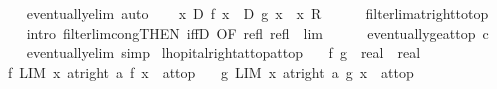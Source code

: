 \begin{isabellebody}
\ \ \ \ \isamarkupfalse%
\ eventually{\isacharunderscore}{\kern0pt}elim\ auto\isanewline
\ \ \isamarkupfalse%
\ {\isachardoublequoteopen}{\isacharparenleft}{\kern0pt}{\isacharparenleft}{\kern0pt}{\isasymlambda}x{\isachardot}{\kern0pt}\ {\isacharquery}{\kern0pt}D\ f{\isacharprime}{\kern0pt}\ x\ {\isacharslash}{\kern0pt}\ {\isacharquery}{\kern0pt}D\ g{\isacharprime}{\kern0pt}\ x{\isacharparenright}{\kern0pt}\ {\isasymlonglongrightarrow}\ x{\isacharparenright}{\kern0pt}\ {\isacharquery}{\kern0pt}R{\isachardoublequoteclose}\isanewline
\ \ \ \ \isamarkupfalse%
\ filterlim{\isacharunderscore}{\kern0pt}at{\isacharunderscore}{\kern0pt}right{\isacharunderscore}{\kern0pt}to{\isacharunderscore}{\kern0pt}top\isanewline
\ \ \ \ \isamarkupfalse%
\ {\isacharparenleft}{\kern0pt}intro\ filterlim{\isacharunderscore}{\kern0pt}cong{\isacharbrackleft}{\kern0pt}THEN\ iffD{}{\isacharcomma}{\kern0pt}\ OF\ refl\ refl\ {\isacharunderscore}{\kern0pt}\ lim{\isacharbrackright}{\kern0pt}{\isacharparenright}{\kern0pt}\isanewline
\ \ \ \ \isamarkupfalse%
\ eventually{\isacharunderscore}{\kern0pt}ge{\isacharunderscore}{\kern0pt}at{\isacharunderscore}{\kern0pt}top{\isacharbrackleft}{\kern0pt}\ c{\isacharequal}{\kern0pt}{}{\isacharbrackright}{\kern0pt}\isanewline
\ \ \ \ \isamarkupfalse%
\ eventually{\isacharunderscore}{\kern0pt}elim\ simp\isanewline
{}\isamarkupfalse%
%
\endisatagproof
{\isafoldproof}%
%
\isadelimproof
\isanewline
%
\endisadelimproof
\isanewline
{}\isamarkupfalse%
\ lhopital{\isacharunderscore}{\kern0pt}right{\isacharunderscore}{\kern0pt}at{\isacharunderscore}{\kern0pt}top{\isacharunderscore}{\kern0pt}at{\isacharunderscore}{\kern0pt}top{\isacharcolon}{\kern0pt}\isanewline
\ \ \ f\ g\ {\isacharcolon}{\kern0pt}{\isacharcolon}{\kern0pt}\ {\isachardoublequoteopen}real\ {\isasymRightarrow}\ real{\isachardoublequoteclose}\isanewline
\ \ \ f{\isacharunderscore}{\kern0pt}{}{\isacharcolon}{\kern0pt}\ {\isachardoublequoteopen}LIM\ x\ at{\isacharunderscore}{\kern0pt}right\ a{\isachardot}{\kern0pt}\ f\ x\ {\isacharcolon}{\kern0pt}{\isachargreater}{\kern0pt}\ at{\isacharunderscore}{\kern0pt}top{\isachardoublequoteclose}\isanewline
\ \ \ g{\isacharunderscore}{\kern0pt}{}{\isacharcolon}{\kern0pt}\ {\isachardoublequoteopen}LIM\ x\ at{\isacharunderscore}{\kern0pt}right\ a{\isachardot}{\kern0pt}\ g\ x\ {\isacharcolon}{\kern0pt}{\isachargreater}{\kern0pt}\ at{\isacharunderscore}{\kern0pt}top{\isachardoublequoteclose}\isanewline

\end{isabellebody}
